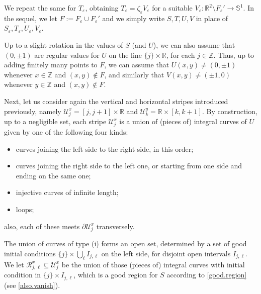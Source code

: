 \documentclass[11pt,a4paper]{amsart}
\newcommand{\Z}{\mathbb{Z}}
\newcommand{\R}{\mathbb{R}}
\newcommand{\de}{\partial}
\newcommand{\nin}{\not\in}
\theoremstyle{definition}
\newcommand{\str}{\mathcal{U}}
\renewcommand{\epsilon}{\varepsilon}
\begin{document}
We repeat the same for $T_\epsilon$, obtaining $T_\epsilon=\zeta_\epsilon V_\epsilon$ for a suitable
$V_\epsilon:\R^2\setminus F_\epsilon'\to\mathbb{S}^1$. In the sequel, we let $F:=F_\epsilon\cup F_\epsilon'$
and we simply write $S,T,U,V$ in place of $S_\epsilon,T_\epsilon,U_\epsilon,V_\epsilon$.

Up to a slight rotation in the values of $S$ (and $U$), we can also assume that $(0,\pm1)$ are regular values for $U$ on the line $\{j\}\times\R$, for each $j\in\Z$. Thus, up to adding finitely many points to $F$, we can assume that $U(x,y)\neq(0,\pm1)$ whenever $x\in\Z$ and $(x,y)\nin F$,
and similarly that $V(x,y)\neq(\pm1,0)$ whenever $y\in\Z$ and $(x,y)\nin F$.

Next, let us consider again the vertical and horizontal stripes
introduced previously, namely $\str_j^x=[j,j+1]\times\R$ and $\str_k^y=\R\times[k,k+1]$. By construction, up to a negligible set, each stripe $\str_j^x$ is a union of (pieces of) integral curves
of $U$ given by one of the following four kinds:
\begin{itemize}
    \item[(i)] curves joining the left side to the right side, in this order;
    \item[(ii)] curves joining the right side to the left one,
    or starting from one side and ending on the same one;
    \item[(iii)] injective curves of infinite length;
    \item[(iv)] loops;
\end{itemize}
also, each of these meets $\de\str_j^x$ transversely.

The union of curves of type (i) forms an open set, determined by
a set of good initial conditions $\{j\}\times\bigcup_\ell I_{j,\ell}$
on the left side, for disjoint open intervals $I_{j,\ell}$.
We let $\mathcal{R}_{j,\ell}^x\subseteq\str_j^x$ be the union of those (pieces of) integral curves with initial condition in $\{j\}\times I_{j,\ell}$,
which is a good region for $S$ according to \cref{good.region}
(see \cref{also.vanish}).

\end{document}
